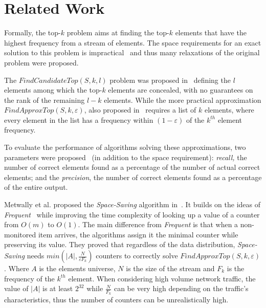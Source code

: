 \section{Related Work}
Formally, the top-$k$ problem aims at finding the top-$k$ elements that have the highest frequency from a stream of elements. The space requirements for an exact solution to this problem is impractical~\cite{Charikar2004} and thus many relaxations of the original problem were proposed.

The $FindCandidateTop(S, k, l)$ problem was proposed in~\cite{Charikar2004} defining the $l$ elements among which the top-$k$ elements are concealed, with no guarantees on the rank of the remaining $l-k$ elements. While the more practical approximation $FindApproxTop(S, k, \varepsilon)$, also proposed in~\cite{Charikar2004} requires a list of $k$ elements, where every element in the list has a frequency within $(1-\varepsilon)$ of the $k^{th}$ element frequency.

To evaluate the performance of algorithms solving these approximations, two parameters were proposed~\cite{Cormode2005} (in addition to the space requirement): \textit{recall,} the number of correct elements found as a percentage of the number of actual correct elements; and the \textit{precision}, the number of correct elements found as a percentage of the entire output.


Metwally et al. proposed the \textit{Space-Saving} algorithm in~\cite{Metwally2005}. It builds on the ideas of \textit{Frequent}~\cite{Demaine2002} while improving the time complexity of looking up a value of a counter from $O(m)$ to $O(1)$. The main difference from \textit{Frequent} is that when a non-monitored item arrives, the algorithms assign it the minimal counter while preserving its value. They proved that regardless of the data distribution, \textit{Space-Saving} needs $min(|A|,\frac{N}{\varepsilon F_k})$ counters to correctly solve $FindApproxTop(S, k, \varepsilon)$. Where $A$ is the elements universe, $N$ is the size of the stream and $F_k$ is the frequency of the $k^{th}$ element. When considering high volume network traffic, the value of $|A|$ is at least $2^{32}$ while $\frac{N}{F_k}$ can be very high depending on the traffic's characteristics, thus the number of counters can be unrealistically high.

